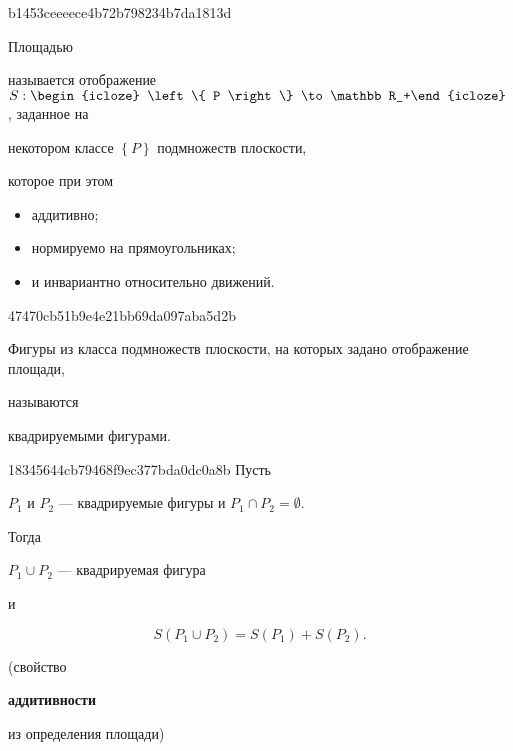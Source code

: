 \begin{note}{b1453ceeeece4b72b798234b7da1813d}
    \begin{icloze}{3}Площадью\end{icloze} называется отображение \({ S : \begin{icloze}{1}\left\{ P \right\} \to \mathbb R_+\end{icloze} }\), заданное на \begin{icloze}{4}некотором классе \({ \left\{ P \right\} }\) подмножеств плоскости,\end{icloze} которое при этом
    \begin{icloze}{2}
        \begin{itemize}
            \item аддитивно;
            \item нормируемо на прямоугольниках;
            \item и инвариантно относительно движений.
        \end{itemize}
    \end{icloze}
\end{note}

\begin{note}{47470cb51b9e4e21bb69da097aba5d2b}
    \begin{icloze}{2}Фигуры из класса подмножеств плоскости, на которых задано отображение площади,\end{icloze} называются \begin{icloze}{1}квадрируемыми фигурами.\end{icloze}
\end{note}

\begin{note}{18345644cb79468f9ec377bda0dc0a8b}
    Пусть \begin{icloze}{3}\({ P_1 }\) и \({ P_2 }\) --- квадрируемые фигуры и \({ P_1 \cap P_2 = \emptyset }\).\end{icloze}
    Тогда \begin{icloze}{1}\({ P_1 \cup P_2 }\) --- квадрируемая фигура\end{icloze} и
    \begin{icloze}{2}
        \[
            S(P_1 \cup P_2) = S(P_1) + S(P_2).
        \]
    \end{icloze}

    \begin{center}
        \tiny
        (свойство \begin{icloze}{4}\textbf{аддитивности}\end{icloze} из определения площади)
    \end{center}
\end{note}

